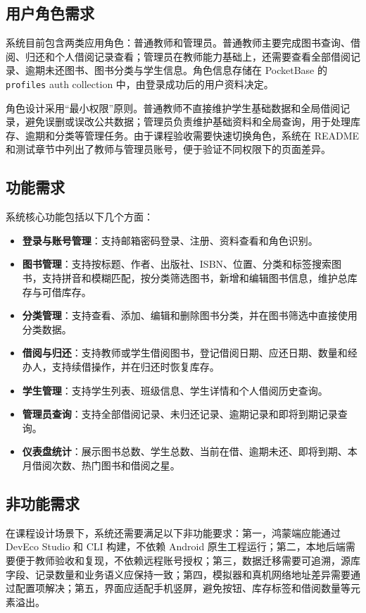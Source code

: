 \subsection{用户角色需求}

系统目前包含两类应用角色：普通教师和管理员。普通教师主要完成图书查询、借阅、归还和个人借阅记录查看；管理员在教师能力基础上，还需要查看全部借阅记录、逾期未还图书、图书分类与学生信息。角色信息存储在 PocketBase 的 \texttt{profiles} auth collection 中，由登录成功后的用户资料决定。

角色设计采用“最小权限”原则。普通教师不直接维护学生基础数据和全局借阅记录，避免误删或误改公共数据；管理员负责维护基础资料和全局查询，用于处理库存、逾期和分类等管理任务。由于课程验收需要快速切换角色，系统在 README 和测试章节中列出了教师与管理员账号，便于验证不同权限下的页面差异。

\subsection{功能需求}

系统核心功能包括以下几个方面：

\begin{itemize}
    \item \textbf{登录与账号管理}：支持邮箱密码登录、注册、资料查看和角色识别。
    \item \textbf{图书管理}：支持按标题、作者、出版社、ISBN、位置、分类和标签搜索图书，支持拼音和模糊匹配，按分类筛选图书，新增和编辑图书信息，维护总库存与可借库存。
    \item \textbf{分类管理}：支持查看、添加、编辑和删除图书分类，并在图书筛选中直接使用分类数据。
    \item \textbf{借阅与归还}：支持教师或学生借阅图书，登记借阅日期、应还日期、数量和经办人，支持续借操作，并在归还时恢复库存。
    \item \textbf{学生管理}：支持学生列表、班级信息、学生详情和个人借阅历史查询。
    \item \textbf{管理员查询}：支持全部借阅记录、未归还记录、逾期记录和即将到期记录查询。
    \item \textbf{仪表盘统计}：展示图书总数、学生总数、当前在借、逾期未还、即将到期、本月借阅次数、热门图书和借阅之星。
\end{itemize}

\subsection{非功能需求}

在课程设计场景下，系统还需要满足以下非功能要求：第一，鸿蒙端应能通过 DevEco Studio 和 CLI 构建，不依赖 Android 原生工程运行；第二，本地后端需要便于教师验收和复现，不依赖远程账号授权；第三，数据迁移需要可追溯，源库字段、记录数量和业务语义应保持一致；第四，模拟器和真机网络地址差异需要通过配置项解决；第五，界面应适配手机竖屏，避免按钮、库存标签和借阅数量等元素溢出。

